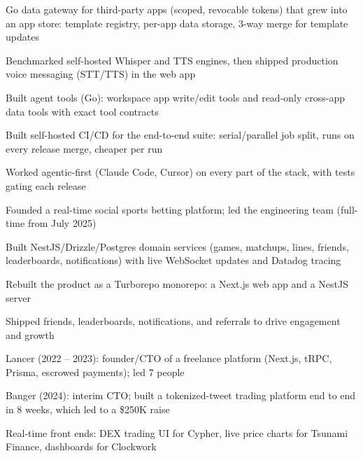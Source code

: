 \documentclass[print]{jack-resume}
\begin{document}
\begin{tightemize}
    \item Go data gateway for third-party apps (scoped, revocable tokens) that grew into an app store: template registry, per-app data storage, 3-way merge for template updates
    \item Benchmarked self-hosted Whisper and TTS engines, then shipped production voice messaging (STT/TTS) in the web app
    \item Built agent tools (Go): workspace app write/edit tools and read-only cross-app data tools with exact tool contracts
    \item Built self-hosted CI/CD for the end-to-end suite: serial/parallel job split, runs on every release merge, cheaper per run
    \item Worked agentic-first (Claude Code, Cursor) on every part of the stack, with tests gating each release
\end{tightemize}
\sectionsep

\begin{tightemize}
    \item Founded a real-time social sports betting platform; led the engineering team (full-time from July 2025)
    \item Built NestJS/Drizzle/Postgres domain services (games, matchups, lines, friends, leaderboards, notifications) with live WebSocket updates and Datadog tracing
    \item Rebuilt the product as a Turborepo monorepo: a Next.js web app and a NestJS server
    \item Shipped friends, leaderboards, notifications, and referrals to drive engagement and growth
\end{tightemize}
\sectionsep

\begin{tightemize}
    \item Lancer (2022 -- 2023): founder/CTO of a freelance platform (Next.js, tRPC, Prisma, escrowed payments); led 7 people
    \item Banger (2024): interim CTO; built a tokenized-tweet trading platform end to end in 8 weeks, which led to a \$250K raise
    \item Real-time front ends: DEX trading UI for Cypher, live price charts for Tsunami Finance, dashboards for Clockwork
\end{tightemize}
\sectionsep
\end{document}
